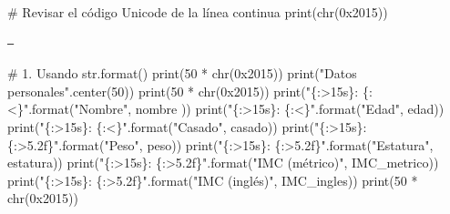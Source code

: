 \documentclass[
  spanish,
  letterpaper,
]{scrbook}
\newenvironment{Shaded}{\begin{snugshade}}{\end{snugshade}}
\newcommand{\BaseNTok}[1]{\textcolor[rgb]{0.68,0.00,0.00}{#1}}
\newcommand{\BuiltInTok}[1]{\textcolor[rgb]{0.00,0.23,0.31}{#1}}
\newcommand{\CommentTok}[1]{\textcolor[rgb]{0.37,0.37,0.37}{#1}}
\newcommand{\DecValTok}[1]{\textcolor[rgb]{0.68,0.00,0.00}{#1}}
\newcommand{\NormalTok}[1]{\textcolor[rgb]{0.00,0.23,0.31}{#1}}
\newcommand{\OperatorTok}[1]{\textcolor[rgb]{0.37,0.37,0.37}{#1}}
\newcommand{\SpecialCharTok}[1]{\textcolor[rgb]{0.37,0.37,0.37}{#1}}
\newcommand{\StringTok}[1]{\textcolor[rgb]{0.13,0.47,0.30}{#1}}
\theoremstyle{definition}
\theoremstyle{remark}
\begin{document}
\begin{Shaded}
\begin{Highlighting}[]
\CommentTok{\# Revisar el código Unicode de la línea continua}
\BuiltInTok{print}\NormalTok{(}\BuiltInTok{chr}\NormalTok{(}\BaseNTok{0x2015}\NormalTok{))}
\end{Highlighting}
\end{Shaded}

\begin{verbatim}
―
\end{verbatim}

\begin{Shaded}
\begin{Highlighting}[]
\CommentTok{\# 1. Usando str.format()}
\BuiltInTok{print}\NormalTok{(}\DecValTok{50} \OperatorTok{*} \BuiltInTok{chr}\NormalTok{(}\BaseNTok{0x2015}\NormalTok{))}
\BuiltInTok{print}\NormalTok{(}\StringTok{"Datos personales"}\NormalTok{.center(}\DecValTok{50}\NormalTok{))}
\BuiltInTok{print}\NormalTok{(}\DecValTok{50} \OperatorTok{*} \BuiltInTok{chr}\NormalTok{(}\BaseNTok{0x2015}\NormalTok{))}
\BuiltInTok{print}\NormalTok{(}\StringTok{"}\SpecialCharTok{\{:\textgreater{}15s\}}\StringTok{: }\SpecialCharTok{\{:\textless{}\}}\StringTok{"}\NormalTok{.}\BuiltInTok{format}\NormalTok{(}\StringTok{"Nombre"}\NormalTok{, nombre ))}
\BuiltInTok{print}\NormalTok{(}\StringTok{"}\SpecialCharTok{\{:\textgreater{}15s\}}\StringTok{: }\SpecialCharTok{\{:\textless{}\}}\StringTok{"}\NormalTok{.}\BuiltInTok{format}\NormalTok{(}\StringTok{"Edad"}\NormalTok{, edad))}
\BuiltInTok{print}\NormalTok{(}\StringTok{"}\SpecialCharTok{\{:\textgreater{}15s\}}\StringTok{: }\SpecialCharTok{\{:\textless{}\}}\StringTok{"}\NormalTok{.}\BuiltInTok{format}\NormalTok{(}\StringTok{"Casado"}\NormalTok{, casado))}
\BuiltInTok{print}\NormalTok{(}\StringTok{"}\SpecialCharTok{\{:\textgreater{}15s\}}\StringTok{: }\SpecialCharTok{\{:\textgreater{}5.2f\}}\StringTok{"}\NormalTok{.}\BuiltInTok{format}\NormalTok{(}\StringTok{"Peso"}\NormalTok{, peso))}
\BuiltInTok{print}\NormalTok{(}\StringTok{"}\SpecialCharTok{\{:\textgreater{}15s\}}\StringTok{: }\SpecialCharTok{\{:\textgreater{}5.2f\}}\StringTok{"}\NormalTok{.}\BuiltInTok{format}\NormalTok{(}\StringTok{"Estatura"}\NormalTok{, estatura))}
\BuiltInTok{print}\NormalTok{(}\StringTok{"}\SpecialCharTok{\{:\textgreater{}15s\}}\StringTok{: }\SpecialCharTok{\{:\textgreater{}5.2f\}}\StringTok{"}\NormalTok{.}\BuiltInTok{format}\NormalTok{(}\StringTok{"IMC (métrico)"}\NormalTok{, IMC\_metrico))}
\BuiltInTok{print}\NormalTok{(}\StringTok{"}\SpecialCharTok{\{:\textgreater{}15s\}}\StringTok{: }\SpecialCharTok{\{:\textgreater{}5.2f\}}\StringTok{"}\NormalTok{.}\BuiltInTok{format}\NormalTok{(}\StringTok{"IMC (inglés)"}\NormalTok{, IMC\_ingles))}
\BuiltInTok{print}\NormalTok{(}\DecValTok{50} \OperatorTok{*} \BuiltInTok{chr}\NormalTok{(}\BaseNTok{0x2015}\NormalTok{))}
\end{Highlighting}
\end{Shaded}
\end{document}
